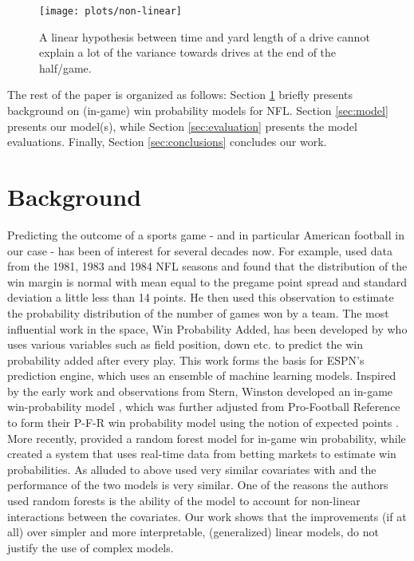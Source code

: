 \documentclass{sig-alternate}
\begin{document}
\begin{figure}[t]
\begin{center}
\texttt{[image: plots/non-linear]}%
 \caption{A linear hypothesis between time and yard length of a drive cannot explain a lot of the variance towards drives at the end of the half/game. }
 \label{fig:non-linear}
\end{center}
\end{figure}


The rest of the paper is organized as follows: 
Section \ref{sec:background} briefly presents background on (in-game) win probability models for NFL.  
Section \ref{sec:model} presents our model(s), while Section \ref{sec:evaluation} presents the model evaluations.  
Finally, Section \ref{sec:conclusions} concludes our work. 

\section{Background}
\label{sec:background}

Predicting the outcome of a sports game - and in particular American football in our case - has been of interest for several decades now. 
For example, \cite{stern91} used data from the 1981, 1983 and 1984 NFL seasons and found that the distribution of the win margin is normal with mean equal to the pregame point spread and standard deviation a little less than 14 points.  
He then used this observation to estimate the probability distribution of the number of games won by a team.  
The most influential work in the space, Win Probability Added, has been developed by \cite{wpa} who uses various variables such as field position, down etc. to predict the win probability added after every play.  
This work forms the basis for ESPN's prediction engine, which uses an ensemble of machine learning models.   
Inspired by the early work and observations from Stern, Winston developed an in-game win-probability model \cite{winston2012mathletics}, which was further adjusted from Pro-Football Reference to form their P-F-R win probability model using the notion of expected points \cite{pfrmodel}.  
More recently, \cite{lock2014using} provided a random forest model for in-game win probability, while \cite{gambletron} created a system that uses real-time data from betting markets to estimate win probabilities. 
As alluded to above \cite{lock2014using} used very similar covariates with {\method} and the performance of the two models is very similar. 
One of the reasons the authors used random forests is the ability of the model to account for non-linear interactions between the covariates. 
Our work shows that the improvements (if at all) over simpler and more interpretable, (generalized) linear models, do not justify the use of complex models. 
\end{document}
